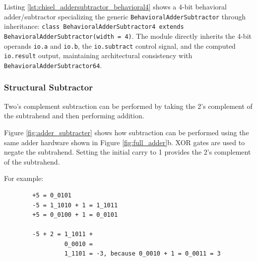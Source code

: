 {

Listing \ref{lst:chisel_addersubtractor_behavioral4} shows a 4-bit behavioral adder/subtractor specializing the generic \texttt{BehavioralAdderSubtractor} through inheritance: \texttt{class BehavioralAdderSubtractor4 extends BehavioralAdderSubtractor(width = 4)}. The module directly inherits the 4-bit operands \texttt{io.a} and \texttt{io.b}, the \texttt{io.subtract} control signal, and the computed \texttt{io.result} output, maintaining architectural consistency with \texttt{BehavioralAdderSubtractor64}.

}%

\subsubsection{Structural Subtractor}
Two's complement subtraction can be performed by taking the 2's complement of the subtrahend and then performing addition.



Figure \ref{fig:adder_subtracter} shows how subtraction can be performed using the same adder hardware shown in Figure \ref{fig:full_adder}b. XOR gates are used to negate the subtrahend. Setting the initial carry to 1 provides the 2's complement of the subtrahend.

For example:
\begin{verbatim}
        +5 = 0_0101
        -5 = 1_1010 + 1 = 1_1011
        +5 = 0_0100 + 1 = 0_0101

        -5 + 2 = 1_1011 +
                 0_0010 =
                 1_1101 = -3, because 0_0010 + 1 = 0_0011 = 3
\end{verbatim}

